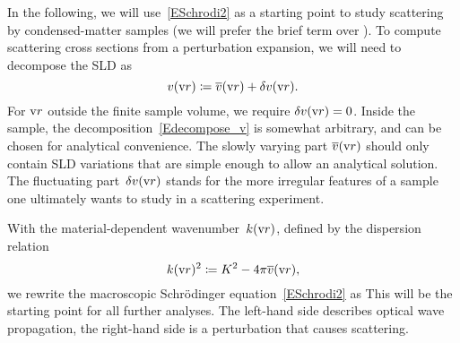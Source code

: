 In the following, we will use~\cref{ESchrodi2}
as a starting point to study scattering by condensed-matter samples
(we will prefer the brief term  over ).
%
%
To compute scattering cross sections from a perturbation expansion,
%
we will need to decompose the SLD as
\begin{equation}\label{Edecompose_v}
  v(\text{v}{r}) \coloneqq \overline{v}(\text{v}{r}) + \delta v(\text{v}{r}).
\end{equation}
%
%
For $\text{v}{r}$ outside the finite sample volume, we require $\delta v(\text{v}{r})=0$.
Inside the sample, the decomposition~\cref{Edecompose_v} is somewhat arbitrary,
and can be chosen for analytical convenience.
The slowly varying part $\overline{v}(\text{v}{r})$ should only contain SLD variations
that are simple enough to allow an analytical solution.
The fluctuating part~$\delta v(\text{v}{r})$ stands for the more irregular
features of a sample one ultimately wants to study in a scattering experiment.

With the material-dependent wavenumber~$k(\text{v}{r})$,
defined by the dispersion relation
%
%
%
\begin{equation}\label{Edispersion}
  k(\text{v}{r})^2 \coloneqq K^2 - 4\pi\overline{v}(\text{v}{r}),
\end{equation}
we rewrite the macroscopic Schrödinger equation~\cref{ESchrodi2} as
%
%
This  will be the starting point for all further analyses.
The left-hand side describes optical wave propagation,
the right-hand side is a perturbation that causes scattering.
%
%
%

